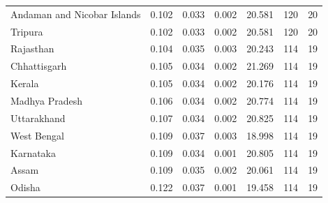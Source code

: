 \begin{tabular}{lrrrrrr}
Andaman and Nicobar Islands & 0.102 & 0.033 & 0.002 & 20.581 & 120 & 20 \\
Tripura & 0.102 & 0.033 & 0.002 & 20.581 & 120 & 20 \\
Rajasthan & 0.104 & 0.035 & 0.003 & 20.243 & 114 & 19 \\
Chhattisgarh & 0.105 & 0.034 & 0.002 & 21.269 & 114 & 19 \\
Kerala & 0.105 & 0.034 & 0.002 & 20.176 & 114 & 19 \\
Madhya Pradesh & 0.106 & 0.034 & 0.002 & 20.774 & 114 & 19 \\
Uttarakhand & 0.107 & 0.034 & 0.002 & 20.825 & 114 & 19 \\
West Bengal & 0.109 & 0.037 & 0.003 & 18.998 & 114 & 19 \\
Karnataka & 0.109 & 0.034 & 0.001 & 20.805 & 114 & 19 \\
Assam & 0.109 & 0.035 & 0.002 & 20.061 & 114 & 19 \\
Odisha & 0.122 & 0.037 & 0.001 & 19.458 & 114 & 19 \\
\bottomrule
\end{tabular}
